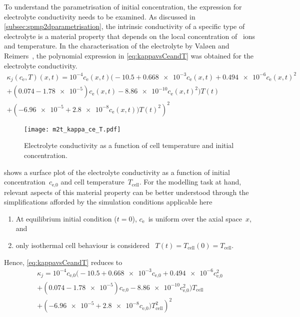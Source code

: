 To  understand  the parametrisation  of  initial  concentration, the  expression
for   electrolyte   conductivity   needs    to   be   examined.   As   discussed
in \cref{subsec:spmp2dparametrisation}, the intrinsic conductivity of a specific
type  of  electrolyte  is  a  material   property  that  depends  on  the  local
concentration of ~ions and  temperature. In the characterisation of the
electrolyte by Valøen and  Reimers~\cite{Valoen2005}, the polynomial expression
in \cref{eq:kappavsCeandT} was obtained for the electrolyte conductivity.
\begin{multline}\label{eq:kappavsCeandT}
    \kappa_j(c_\text{e},T)(x,t) =  10^{-4} c_\text{e}(x,t) \bigl(-10.5 + \num{0.668e-3} c_\text{e}(x,t) + \num{0.494e-6}  c_\text{e}{(x,t)}^2\\
    + (0.074 - \num{1.78e-5}) c_\text{e}(x,t) - \num{8.86e-10} c_\text{e}{(x,t)}^2 \bigr)T(t)\\
	+ \left(\num{-6.96e-5} + \num{2.8e-8} c_\text{e}{(x,t)})T(t)^2\right)^2
\end{multline}

\begin{figure}[!htbp]
    \centering
    \texttt{[image: m2t\_kappa\_ce\_T.pdf]}
    \caption[Surface plot of electrolyte conductivity]
    {Electrolyte conductivity as a function of cell temperature and initial concentration.
    }%
    \label{fig:kappavsCeandT}
\end{figure}

   shows    a   surface   plot   of    the   electrolyte
conductivity  as a  function  of initial  concentration~$c_\text{e,0}$ and  cell
temperature~$T_\text{cell}$. For the modelling task at hand, relevant aspects of
this  material property  can be  better understood  through the  simplifications
afforded by the simulation conditions applicable here \ie{}
\begin{enumerate}%
    \item At  equilibrium  initial condition ($t=0$), $c_\text{e}$~is uniform over the axial space~$x$, and
    \item only isothermal cell behaviour is considered \ie~${T(t) = T_\text{cell}(0)= T_\text{cell}}$.
\end{enumerate}
Hence, \cref{eq:kappavsCeandT} reduces to
\begin{multline}\label{eq:kappavsCeinitandTcell}
    \kappa_j =  10^{-4} c_\text{e,0} \bigl(-10.5 + \num{0.668e-3} c_\text{e,0} + \num{0.494e-6}  c_\text{e,0}^2\\
        + (0.074 - \num{1.78e-5}) c_\text{e,0} - \num{8.86e-10}
    c_\text{e,0}^2 \bigr)T_\text{cell}\\
	+ \left(\num{-6.96e-5} + \num{2.8e-8} c_\text{e,0})T_\text{cell}^2\right)^2
\end{multline}

